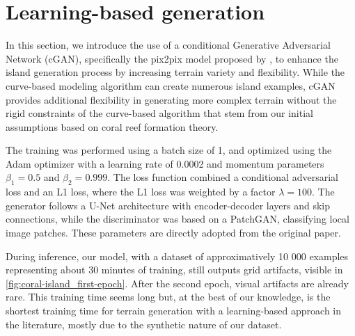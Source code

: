 \section{Learning-based generation}
\label{sec:coral-island_learning-based}


In this section, we introduce the use of a conditional Generative Adversarial Network (cGAN), specifically the pix2pix model proposed by \cite{Isola2017}, to enhance the island generation process by increasing terrain variety and flexibility. While the curve-based modeling algorithm can create numerous island examples, cGAN provides additional flexibility in generating more complex terrain without the rigid constraints of the curve-based algorithm that stem from our initial assumptions based on coral reef formation theory. 

% 

The training was performed using a batch size of 1, and optimized using the Adam optimizer with a learning rate of 0.0002 and momentum parameters $\beta_1 = 0.5$ and $\beta_2 = 0.999$. The loss function combined a conditional adversarial loss and an L1 loss, where the L1 loss was weighted by a factor $\lambda = 100$. The generator follows a U-Net architecture with encoder-decoder layers and skip connections, while the discriminator was based on a PatchGAN, classifying local image patches. These parameters are directly adopted from the original paper.

During inference, our model, with a dataset of approximatively 10 000 examples representing about 30 minutes of training, still outputs grid artifacts, visible in \cref{fig:coral-island_first-epoch}. After the second epoch, visual artifacts are already rare. This training time seems long but, at the best of our knowledge, is the shortest training time for terrain generation with a learning-based approach in the literature, mostly due to the synthetic nature of our dataset.

